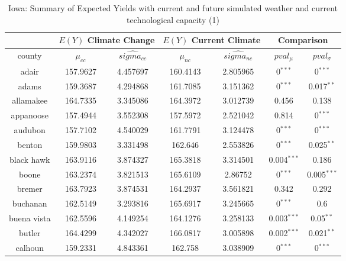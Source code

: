 \begin{table}[]
\caption{Iowa: Summary of Expected Yields with current and future simulated weather and current technological capacity (1)}
\label{my-label}
\begin{tabular}{|c|cc|cc|cc|}
\hline
\multicolumn{1}{|c}{} & \multicolumn{2}{|c}{$E(Y)$ Climate Change} & \multicolumn{2}{|c}{$E(Y)$ Current Climate} & \multicolumn{2}{|c|}{Comparison}\\ 
\hline
county        & $\mu_{cc}$ & $\hat{sigma_{cc}}$ & $\mu_{nc}$ & $\hat{sigma_{nc}}$ & $pval_{\mu}$ & $pval_{\sigma}$ \\
\hline
adair         & 157.9627  & 4.457697          & 160.4143  & 2.805965          & 0$^{***}$     & 0$^{***}$     \\
adams         & 159.3687  & 4.294868          & 161.7085  & 3.151362          & 0$^{***}$     & 0.017$^{**}$  \\
allamakee     & 164.7335  & 3.345086          & 164.3972  & 3.012739          & 0.456                         & 0.138                         \\
appanoose     & 157.4944  & 3.552308          & 157.5972  & 2.521042          & 0.814                         & 0$^{***}$     \\
audubon       & 157.7102  & 4.540029          & 161.7791  & 3.124478          & 0$^{***}$     & 0$^{***}$     \\
benton        & 159.9803  & 3.331498          & 162.646   & 2.553826          & 0$^{***}$     & 0.025$^{**}$  \\
black hawk    & 163.9116  & 3.874327          & 165.3818  & 3.314501          & 0.004$^{***}$ & 0.186                         \\
boone         & 163.2374  & 3.821513          & 165.6109  & 2.86752           & 0$^{***}$     & 0.005$^{***}$ \\
bremer        & 163.7923  & 3.874531          & 164.2937  & 3.561821          & 0.342                         & 0.292                         \\
buchanan      & 162.5149  & 3.293816          & 165.6917  & 3.245665          & 0$^{***}$     & 0.6                           \\
buena vista   & 162.5596  & 4.149254          & 164.1276  & 3.258133          & 0.003$^{***}$ & 0.05$^{**}$   \\
butler        & 164.4299  & 4.342027          & 166.0817  & 3.005898          & 0.002$^{***}$ & 0.021$^{**}$  \\
calhoun       & 159.2331  & 4.843361          & 162.758   & 3.038909          & 0$^{***}$     & 0$^{***}$     \\

\end{tabular}
\end{table}
